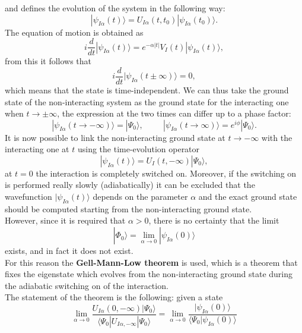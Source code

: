 and defines the evolution of the system in the following way:
\begin{equation}
    |\psi_{I\alpha}(t)\rangle=U_{I\alpha}(t,t_0)|\psi_{I\alpha}(t_0)\rangle.
\end{equation}
The equation of motion is obtained as
\begin{equation}
    i\frac{d}{dt}|\psi_{I\alpha}(t)\rangle = e^{-\alpha |t|} V_I(t)|\psi_{I\alpha}(t)\rangle,
\end{equation}
from this it follows that 
\begin{equation}
    i\frac{d}{dt}|\psi_{I\alpha}(t\pm\infty)\rangle = 0,
\end{equation}
which means that the state is time-independent. We can thus take the ground state of the non-interacting system as the ground state for the 
interacting one when $t\to\pm\infty$, the expression at the two times can differ up to a phase factor:
\begin{equation}
    |\psi_{I\alpha}(t\to-\infty)\rangle=|\Psi_0\rangle,\hspace{1cm}|\psi_{I\alpha}(t\to\infty)\rangle=e^{i\phi}|\Psi_0\rangle.
\end{equation}
It is now possible to link the non-interacting ground state at $t\to-\infty$ with the interacting one at $t$ using the time-evolution 
operator
\begin{equation}
    |\psi_{I\alpha}(t)\rangle=U_I(t,-\infty)|\Psi_0\rangle,
\end{equation}
at $t=0$ the interaction is completely switched on. Moreover, if the switching on is performed really slowly (adiabatically) it can be 
excluded that the wavefunction $|\psi_{I\alpha}(t)\rangle$ depends on the parameter $\alpha$ and the exact ground state should be computed starting from 
the non-interacting ground state.\\
However, since it is required that $\alpha>0$, there is no certainty that the limit
\begin{equation}
    |\Phi_0\rangle=\lim_{\alpha\to0}|\psi_{I\alpha}(0)\rangle
\end{equation}
exists, and in fact it does not exist.\\
For this reason the \textbf{Gell-Mann-Low theorem} \cite{PhysRev.84.350} is used, which is a theorem that fixes the eigenstate which evolves from the non-interacting 
ground state during the adiabatic switching on of the interaction.\\
The statement of the theorem is the following: given a state
\begin{equation}
    \lim_{\alpha\to 0}\frac{U_{I\alpha}(0,-\infty)|\Psi_0\rangle}{\langle\Psi_0|U_{I\alpha,-\infty}|\Psi_0\rangle}=\lim_{\alpha\to 0}\frac{|\psi_{I\alpha}(0)\rangle}{\langle\Psi_0|\psi_{I\alpha}(0)\rangle}
\end{equation}
